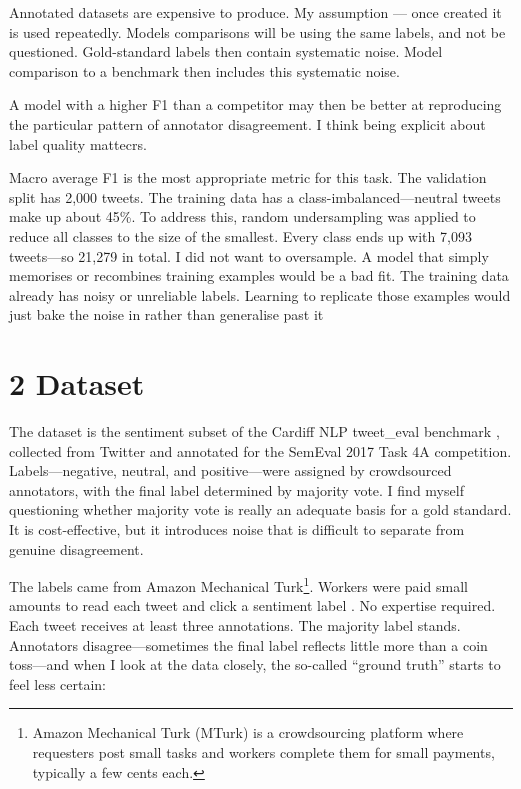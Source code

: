 \documentclass[12pt]{article}
\begin{document}
Annotated datasets are expensive to produce. 
My assumption ---
 once created it is used repeatedly. 
 Models comparisons will be using the same labels, and not be questioned. 
 Gold-standard labels  then contain systematic noise. 
Model comparison to a benchmark then includes this systematic noise. 
 
 A model with a higher F1 than a competitor may then
 be better at reproducing the particular pattern 
 of annotator disagreement. 
 I think being explicit about label quality mattecrs.

Macro average F1 is the most appropriate metric for this task. 
The validation split has 2,000 tweets. 
The training data has a class-imbalanced---neutral tweets make up about 45\%. 
To address this, random undersampling was applied to reduce all classes to the size of the smallest. Every class ends up with 7,093 tweets---so 21,279 in total. 
I did not want to oversample.
A model that simply memorises or recombines training examples would be a bad fit.
The training data already has noisy or unreliable labels. 
Learning to replicate those examples would just bake the noise in rather than generalise past it



\section*{2 Dataset}



The dataset is the sentiment subset of the Cardiff NLP tweet\_eval benchmark \citep{barbieri2020tweeteval}, collected from Twitter and annotated for the SemEval 2017 Task 4A competition. Labels---negative, neutral, and positive---were assigned by crowdsourced annotators, with the final label determined by majority vote. I find myself questioning whether majority vote is really an adequate basis for a gold standard. It is cost-effective, but it introduces noise that is difficult to separate from genuine disagreement.

The labels came from Amazon Mechanical Turk\footnote{Amazon Mechanical Turk (MTurk) is a crowdsourcing platform where requesters post small tasks and workers complete them for small payments, typically a few cents each.}. Workers were paid small amounts to read each tweet and click a sentiment label \citep{rosenthal2017semeval}. No expertise required. Each tweet receives at least three annotations. The majority label stands. Annotators disagree---sometimes the final label reflects little more than a coin toss---and when I look at the data closely, the so-called ``ground truth'' starts to feel less certain:
\end{document}
